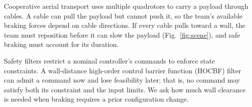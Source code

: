 %

Cooperative aerial transport uses multiple quadrotors to carry a payload through cables.  A cable can pull the payload but cannot push it, so the team's available braking forces depend on cable directions.  If every cable pulls toward a wall, the team must reposition before it can slow the payload (Fig.~\ref{fig:scene}), and safe braking must account for its duration.

Safety filters restrict a nominal controller's commands to enforce state constraints.  A wall-distance high-order control barrier function (HOCBF) filter can admit a command now and lose feasibility later; that is, no command may satisfy both its constraint and the input limits.  We ask how much wall clearance is needed when braking requires a prior configuration change.

